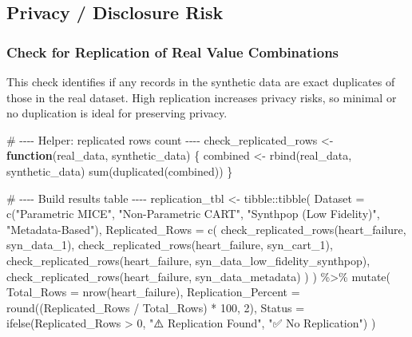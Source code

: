 \documentclass[
  letterpaper,
  DIV=11,
  numbers=noendperiod]{scrartcl}
\newenvironment{Shaded}{\begin{snugshade}}{\end{snugshade}}
\newcommand{\AttributeTok}[1]{\textcolor[rgb]{0.40,0.45,0.13}{#1}}
\newcommand{\CommentTok}[1]{\textcolor[rgb]{0.37,0.37,0.37}{#1}}
\newcommand{\ControlFlowTok}[1]{\textcolor[rgb]{0.00,0.23,0.31}{\textbf{#1}}}
\newcommand{\DecValTok}[1]{\textcolor[rgb]{0.68,0.00,0.00}{#1}}
\newcommand{\FunctionTok}[1]{\textcolor[rgb]{0.28,0.35,0.67}{#1}}
\newcommand{\NormalTok}[1]{\textcolor[rgb]{0.00,0.23,0.31}{#1}}
\newcommand{\OtherTok}[1]{\textcolor[rgb]{0.00,0.23,0.31}{#1}}
\newcommand{\SpecialCharTok}[1]{\textcolor[rgb]{0.37,0.37,0.37}{#1}}
\newcommand{\StringTok}[1]{\textcolor[rgb]{0.13,0.47,0.30}{#1}}
\begin{document}
\subsection{Privacy / Disclosure Risk}\label{privacy-disclosure-risk}

\subsubsection{Check for Replication of Real Value
Combinations}\label{check-for-replication-of-real-value-combinations}

This check identifies if any records in the synthetic data are exact
duplicates of those in the real dataset. High replication increases
privacy risks, so minimal or no duplication is ideal for preserving
privacy.

\begin{Shaded}
\begin{Highlighting}[]
\CommentTok{\# {-}{-}{-}{-} Helper: replicated rows count {-}{-}{-}{-}}
\NormalTok{check\_replicated\_rows }\OtherTok{\textless{}{-}} \ControlFlowTok{function}\NormalTok{(real\_data, synthetic\_data) \{}
\NormalTok{  combined }\OtherTok{\textless{}{-}} \FunctionTok{rbind}\NormalTok{(real\_data, synthetic\_data)}
  \FunctionTok{sum}\NormalTok{(}\FunctionTok{duplicated}\NormalTok{(combined))}
\NormalTok{\}}

\CommentTok{\# {-}{-}{-}{-} Build results table {-}{-}{-}{-}}
\NormalTok{replication\_tbl }\OtherTok{\textless{}{-}}\NormalTok{ tibble}\SpecialCharTok{::}\FunctionTok{tibble}\NormalTok{(}
  \AttributeTok{Dataset =} \FunctionTok{c}\NormalTok{(}\StringTok{"Parametric MICE"}\NormalTok{, }\StringTok{"Non{-}Parametric CART"}\NormalTok{, }
              \StringTok{"Synthpop (Low Fidelity)"}\NormalTok{, }\StringTok{"Metadata{-}Based"}\NormalTok{),}
  \AttributeTok{Replicated\_Rows =} \FunctionTok{c}\NormalTok{(}
    \FunctionTok{check\_replicated\_rows}\NormalTok{(heart\_failure, syn\_data\_1),}
    \FunctionTok{check\_replicated\_rows}\NormalTok{(heart\_failure, syn\_cart\_1),}
    \FunctionTok{check\_replicated\_rows}\NormalTok{(heart\_failure, syn\_data\_low\_fidelity\_synthpop),}
    \FunctionTok{check\_replicated\_rows}\NormalTok{(heart\_failure, syn\_data\_metadata)}
\NormalTok{  )}
\NormalTok{) }\SpecialCharTok{\%\textgreater{}\%}
  \FunctionTok{mutate}\NormalTok{(}
    \AttributeTok{Total\_Rows =} \FunctionTok{nrow}\NormalTok{(heart\_failure),}
    \AttributeTok{Replication\_Percent =} \FunctionTok{round}\NormalTok{((Replicated\_Rows }\SpecialCharTok{/}\NormalTok{ Total\_Rows) }\SpecialCharTok{*} \DecValTok{100}\NormalTok{, }\DecValTok{2}\NormalTok{),}
    \AttributeTok{Status =} \FunctionTok{ifelse}\NormalTok{(Replicated\_Rows }\SpecialCharTok{\textgreater{}} \DecValTok{0}\NormalTok{, }\StringTok{"⚠️ Replication Found"}\NormalTok{, }\StringTok{"✅ No Replication"}\NormalTok{)}
\NormalTok{  )}


\end{Highlighting}
\end{Shaded}
\end{document}
